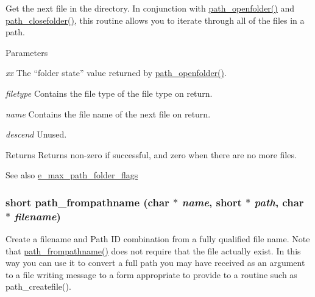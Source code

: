Get the next file in the directory. In conjunction with \hyperlink{group__files_ga80aa97732be321d9f2e2212485e0367a}{path\_\-openfolder()} and \hyperlink{group__files_ga63ca3fd6e4acb9f1b1e56b2d609bf4af}{path\_\-closefolder()}, this routine allows you to iterate through all of the files in a path.


\begin{DoxyParams}{Parameters}
\item[{\em xx}]The “folder state” value returned by \hyperlink{group__files_ga80aa97732be321d9f2e2212485e0367a}{path\_\-openfolder()}. \item[{\em filetype}]Contains the file type of the file type on return. \item[{\em name}]Contains the file name of the next file on return. \item[{\em descend}]Unused. \end{DoxyParams}
\begin{DoxyReturn}{Returns}
Returns non-\/zero if successful, and zero when there are no more files. 
\end{DoxyReturn}
\begin{DoxySeeAlso}{See also}
\hyperlink{group__files_ga9ed75cc34f42beefdd8d3075ae2dbe53}{e\_\-max\_\-path\_\-folder\_\-flags} 
\end{DoxySeeAlso}
\hypertarget{group__files_ga8c688029042bf8a21d9f1c87561be8da}{
\subsubsection[{path\_\-frompathname}]{\setlength{\rightskip}{0pt plus 5cm}short path\_\-frompathname (char $\ast$ {\em name}, \/  short $\ast$ {\em path}, \/  char $\ast$ {\em filename})}}
\label{group__files_ga8c688029042bf8a21d9f1c87561be8da}


Create a filename and Path ID combination from a fully qualified file name. Note that \hyperlink{group__files_ga8c688029042bf8a21d9f1c87561be8da}{path\_\-frompathname()} does not require that the file actually exist. In this way you can use it to convert a full path you may have received as an argument to a file writing message to a form appropriate to provide to a routine such as path\_\-createfile().


